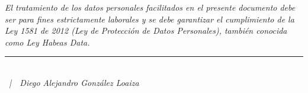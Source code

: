 \documentclass[12pt]{article}
\begin{document}
    
    
    
    

    {\vfill}

    {\footnotesize
    \begin{minipage}[t]{\textwidth}
        \begin{center}
            \textit{
                El tratamiento de los datos personales facilitados en el presente documento debe ser para fines estrictamente laborales y se debe garantizar el cumplimiento de la Ley 1581 de 2012 (Ley de Protección de Datos Personales), también conocida como Ley Habeas Data. \\
                }
                \rule{.8\textwidth}{0.1pt} \\
                \textit{\the\year~|~~Diego Alejandro González Loaiza}
            \end{center}
        \end{minipage}
        }
\end{document}
